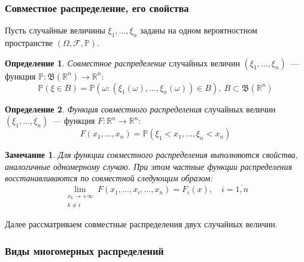 \documentclass[oneside,final,14pt]{extreport}
\newtheorem*{rmrk}{Замечание}
\theoremstyle{definition}
\newtheorem{defn}{Определение}[section]
\begin{document}
\subsubsection{Совместное распределение, его свойства}

Пусть случайные величины $\xi_1, ..., \xi_n$ заданы на одном вероятностном пространстве $(\Omega, \mathcal{F}, \mathbb{P})$.
\begin{defn}
    {\it Совместное распределение} случайных величин $(\xi_1, \ldots, \xi_n)$~--- функция $\mathbb{P}: \mathfrak{B}(\mathbb{R}^{n}) \to \mathbb{R}^{n}$:
    \begin{equation*}
        \mathbb{P}(\xi \in B) = \mathbb{P}(\omega: (\xi_{1}(\omega), \ldots, \xi_{n}(\omega)) \in B),~ B \subset \mathfrak{B}(\mathbb{R}^{n})
    \end{equation*}
\end{defn}
\begin{defn}
    {\it Функция совместного распределения} случайных величин $(\xi_1, \ldots, \xi_n)$~--- функция $F: \mathbb{R}^{n} \to \mathbb{R}^{n}$:
    \begin{equation*}
        F(x_{1}, \ldots, x_{n})=\mathbb{P}(\xi_{1}<x_{1}, \ldots, \xi_{n}<x_{n})
    \end{equation*}
\end{defn}

\begin{rmrk}
    Для функции совместного распределения выполняются свойства, аналогичные одномерному случаю. При этом частные функции распределения восстанавливаются по совместной следующим образом:
    \begin{equation*}
        \lim_{\substack{x_{k} \to +\infty \\ k \neq i}}  F(x_{1}, \ldots, x_{i}, \ldots, x_{n}) = F_{i}(x), \quad i = \overline{1,n}
    \end{equation*}
\end{rmrk}
Далее рассматриваем совместные распределения двух случайных величин.

\subsubsection{Виды многомерных распределений}
\end{document}
